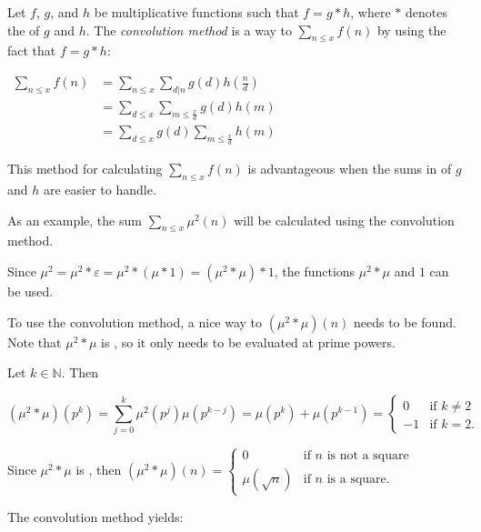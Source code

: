 \documentclass[12pt]{article}
\begin{document}
Let $f$, $g$, and $h$ be multiplicative functions such that $f=g*h$, where $*$ denotes the  of $g$ and $h$.  The {\sl convolution method\/} is a way to  $\displaystyle \sum_{n \le x} f(n)$ by using the fact that $f=g*h$:

\begin{center}
$\begin{array}{ll}
\displaystyle \sum_{n \le x} f(n) & \displaystyle = \sum_{n \le x} \sum_{d|n} g(d) h \left( \frac{n}{d} \right) \\
& \displaystyle = \sum_{d \le x} \sum_{m \le \frac{x}{d}} g(d) h(m) \\
& \displaystyle = \sum_{d \le x} g(d) \sum_{m \le \frac{x}{d}} h(m)
\end{array}$
\end{center}

This method for calculating $\displaystyle \sum_{n \le x} f(n)$ is advantageous when the sums in  of $g$ and $h$ are easier to handle.

As an example, the sum $\displaystyle \sum_{n \le x} \mu^2(n)$ will be calculated using the convolution method.

Since $\mu^2=\mu^2*\varepsilon=\mu^2*(\mu*1)=(\mu^2*\mu)*1$, the functions $\mu^2*\mu$ and $1$ can be used.

To use the convolution method, a nice way to  $(\mu^2*\mu)(n)$ needs to be found.  Note that $\mu^2*\mu$ is , so it only needs to be evaluated at prime powers.

Let $k \in \mathbb{N}$.  Then

$$ (\mu^2*\mu)(p^k) = \sum_{j=0}^k \mu^2(p^j) \mu(p^{k-j}) = \mu(p^k)+\mu(p^{k-1}) = \begin{cases}
0 & \text{if } k \neq 2 \\
-1 & \text{if } k=2. \end{cases}$$

Since $\mu^2*\mu$ is , then $(\mu^2*\mu)(n)= \begin{cases}
0 & \text{if } n \text{ is not a square} \\
\mu(\sqrt{n}) & \text{if } n \text{ is a square.} \end{cases}$

The convolution method yields:
\end{document}
